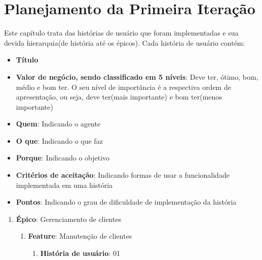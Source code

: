 \chapter{Planejamento da Primeira Iteração}
Este capítulo trata das histórias de usuário que foram implementadas e sua devida hierarquia(de história até os épicos). Cada história de usuário contém:
\begin{itemize}
\item \textbf{Título}
\item \textbf{Valor de negócio, sendo classificado em 5 níveis}: Deve ter, ótimo, bom, médio e bom ter. O seu nível de importãncia é a respectiva ordem de apresentação, ou seja, deve ter(mais importante) e bom ter(menos importante)
\item \textbf{Quem}: Indicando o agente
\item \textbf{O que}: Indicando o que faz
\item \textbf{Porque}: Indicando o objetivo
\item \textbf{Critérios de aceitação}: Indicando formas de usar a funcionalidade implementada em uma história
\item \textbf{Pontos}: Indicando o grau de dificuldade de implementação da história
\end{itemize}

\begin{enumerate}
	\item \textbf{Épico}: Gerenciamento de clientes
	\begin{enumerate}
		\item \textbf{Feature}: Manutenção de clientes
		\begin{enumerate}
		\item \textbf{História de usuário}: 01
		\end{enumerate}
	\end{enumerate}
\end{enumerate}

